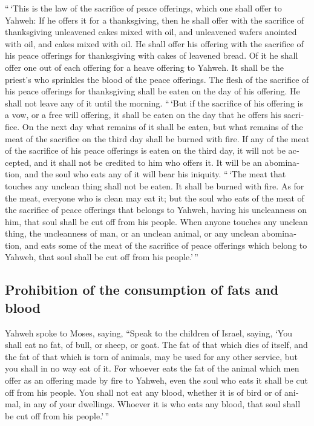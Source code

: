 \begin{paracol}{2}
\begin{otherlanguage}{english}
 ``\,`This is the law of the sacrifice of peace
offerings, which one shall offer to Yahweh:  If he offers
it for a thanksgiving, then he shall offer with the sacrifice of
thanksgiving unleavened cakes mixed with oil, and unleavened wafers
anointed with oil, and cakes mixed with oil.  He shall
offer his offering with the sacrifice of his peace offerings for
thanksgiving with cakes of leavened bread.  Of it he
shall offer one out of each offering for a heave offering to Yahweh. It
shall be the priest's who sprinkles the blood of the peace offerings.
 The flesh of the sacrifice of his peace offerings for
thanksgiving shall be eaten on the day of his offering. He shall not
leave any of it until the morning.  ``\,`But if the
sacrifice of his offering is a vow, or a free will offering, it shall be
eaten on the day that he offers his sacrifice. On the next day what
remains of it shall be eaten,  but what remains of the
meat of the sacrifice on the third day shall be burned with fire.
 If any of the meat of the sacrifice of his peace
offerings is eaten on the third day, it will not be accepted, and it
shall not be credited to him who offers it. It will be an abomination,
and the soul who eats any of it will bear his iniquity. 
``\,`The meat that touches any unclean thing shall not be eaten. It
shall be burned with fire. As for the meat, everyone who is clean may
eat it;  but the soul who eats of the meat of the
sacrifice of peace offerings that belongs to Yahweh, having his
uncleanness on him, that soul shall be cut off from his people.
 When anyone touches any unclean thing, the uncleanness
of man, or an unclean animal, or any unclean abomination, and eats some
of the meat of the sacrifice of peace offerings which belong to Yahweh,
that soul shall be cut off from his people.'\,''

\hypertarget{prohibition-of-the-consumption-of-fats-and-blood}{%
\subsection{Prohibition of the consumption of fats and
blood}\label{prohibition-of-the-consumption-of-fats-and-blood}}

 Yahweh spoke to Moses, saying,  ``Speak
to the children of Israel, saying, `You shall eat no fat, of bull, or
sheep, or goat.  The fat of that which dies of itself,
and the fat of that which is torn of animals, may be used for any other
service, but you shall in no way eat of it.  For whoever
eats the fat of the animal which men offer as an offering made by fire
to Yahweh, even the soul who eats it shall be cut off from his people.
 You shall not eat any blood, whether it is of bird or of
animal, in any of your dwellings.  Whoever it is who eats
any blood, that soul shall be cut off from his people.'\,''


\end{otherlanguage}
\end{paracol}

